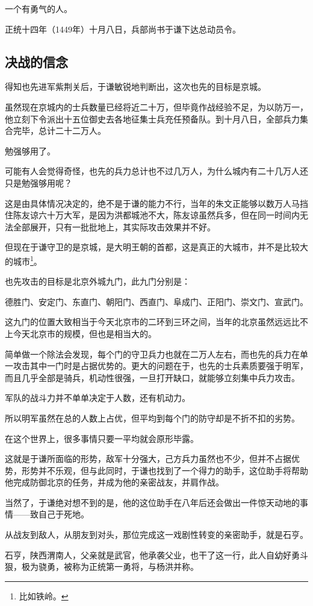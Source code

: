 \begin{multicols}{\theparacolNo}
一个有勇气的人。

正统十四年（1449年）十月八日，兵部尚书于谦下达总动员令。

\subsection{决战的信念}
得知也先进军紫荆关后，于谦敏锐地判断出，这次也先的目标是京城。

虽然现在京城内的士兵数量已经将近二十万，但毕竟作战经验不足，为以防万一，他立刻下令派出十五位御史去各地征集士兵充任预备队。到十月八日，全部兵力集合完毕，总计二十二万人。

勉强够用了。

可能有人会觉得奇怪，也先的兵力总计也不过几万人，为什么城内有二十几万人还只是勉强够用呢？

这是由具体情况决定的，绝不是于谦的能力不行，当年的朱文正能够以数万人马挡住陈友谅六十万大军，是因为洪都城池不大，陈友谅虽然兵多，但在同一时间内无法全部展开，只有一批批地上，其实际攻击效果并不好。

但现在于谦守卫的是京城，是大明王朝的首都，这是真正的大城市，并不是比较大的城市\footnote{比如铁岭。}。

也先攻击的目标是北京外城九门，此九门分别是：

德胜门、安定门、东直门、朝阳门、西直门、阜成门、正阳门、崇文门、宣武门。

这九门的位置大致相当于今天北京市的二环到三环之间，当年的北京虽然远远比不上今天北京市的规模，但也是相当大的。

简单做一个除法会发现，每个门的守卫兵力也就在二万人左右，而也先的兵力在单一攻击其中一门时是占据优势的。更大的问题在于，也先的士兵素质要强于明军，而且几乎全部是骑兵，机动性很强，一旦打开缺口，就能够立刻集中兵力攻击。

军队的战斗力并不单单决定于人数，还有机动力。

所以明军虽然在总的人数上占优，但平均到每个门的防守却是不折不扣的劣势。

在这个世界上，很多事情只要一平均就会原形毕露。

这就是于谦所面临的形势，敌军十分强大，己方兵力虽然也不少，但并不占据优势，形势并不乐观，但与此同时，于谦也找到了一个得力的助手，这位助手将帮助他完成防御北京的任务，并成为他的亲密战友，并肩作战。

当然了，于谦绝对想不到的是，他的这位助手在八年后还会做出一件惊天动地的事情——致自己于死地。

从战友到敌人，从朋友到对头，那位完成这一戏剧性转变的亲密助手，就是石亨。

石亨，陕西渭南人，父亲就是武官，他承袭父业，也干了这一行，此人自幼好勇斗狠，极为骁勇，被称为正统第一勇将，与杨洪并称。


\end{multicols}
